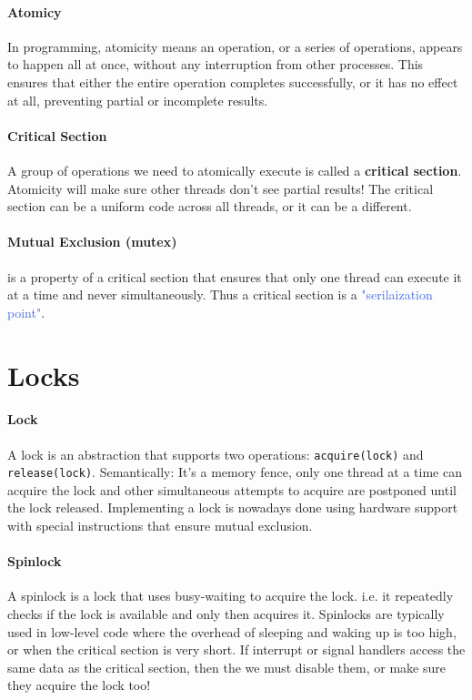 \documentclass[openany,12pt]{book}
\newcommand{\code}[1]{\texttt{#1}}
\newcommand{\blue}[1]{\textcolor{RoyalBlue}{#1}}
\begin{document}
\paragraph{Atomicy} In programming, atomicity means an operation, or a series of operations, appears to happen all at once, without any interruption from other processes. This ensures that either the entire operation completes successfully, or it has no effect at all, preventing partial or incomplete results.


\paragraph{Critical Section} A group of operations we need to atomically execute is called a \textbf{critical section}. Atomicity will make sure other threads don't see partial results! The critical section can be a uniform code across all threads, or it can be a different.

\paragraph{Mutual Exclusion (mutex)} is a property of a critical section that ensures that only one thread can execute it at a time and never simultaneously. Thus a critical section is a \blue{"serilaization point"}.



\section*{Locks}

\paragraph{Lock} A lock is an abstraction that supports two operations: \code{acquire(lock)} and \code{release(lock)}.
Semantically: It's a memory fence, only one thread at a time can acquire the lock and other simultaneous attempts to acquire are postponed until the lock released. Implementing a lock is nowadays done using hardware support with special instructions that ensure mutual exclusion.

\paragraph{Spinlock} A spinlock is a lock that uses busy-waiting to acquire the lock. i.e. it repeatedly checks if the lock is available and only then acquires it. Spinlocks are typically used in low-level code where the overhead of sleeping and waking up is too high, or when the critical section is very short. If interrupt or signal handlers access the same data as the critical section, then the we must disable them, or make sure they acquire the lock too!
\end{document}
